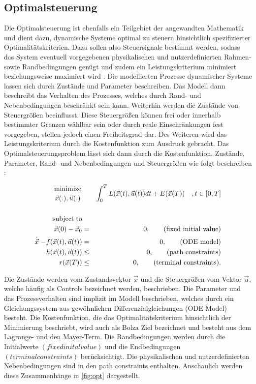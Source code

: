 \subsection{Optimalsteuerung}

Die Optimalsteuerung ist ebenfalls ein Teilgebiet der angewandten Mathematik und dient dazu, dynamische Systeme optimal zu steuern hinsichtlich spezifizierter Optimalitätskriterien. Dazu sollen also Steuersignale bestimmt werden, sodass das System eventuell vorgegebenen physikalischen und nutzerdefinierten Rahmen- sowie Randbedingungen genügt und zudem ein Leistungskriterium minimiert beziehungsweise maximiert wird \cite[S.~3f.]{ki04}.
Die modellierten Prozesse dynamischer Systeme lassen sich durch Zustände und Parameter beschreiben. Das Modell dann beschreibt das Verhalten des Prozesses, welches durch Rand- und Nebenbedingungen beschränkt sein kann. Weiterhin werden die Zustände von Steuergrößen beeinflusst. Diese Steuergrößen können frei oder innerhalb bestimmter Grenzen wählbar sein oder durch reale Einschränkungen fest vorgegeben, stellen jedoch einen Freiheitsgrad dar. Des Weiteren wird das Leistungskriterium durch die Kostenfunktion zum Ausdruck gebracht. Das Optimalsteuerungsproblem lässt sich dann durch die Kostenfunktion, Zustände, Parameter, Rand- und Nebenbedingungen und Steuergrößen wie folgt beschreiben \cite[S.~61]{di14}:

\begin{eqnarray}
\label{eq:opt}
		{\text{minimize} \atop \vec{x}(.),\vec{u}(.)} & &\int_0^T L(\vec{x}(t),\vec{u}(t)) dt + E(\vec{x}(T)) \quad ,t \in [0,T] \\
\nonumber		&&\\
\nonumber		\text{subject}\; \text{to} & &\\
\nonumber		\vec{x}(0)-\vec{x}_{0} & = & 0,	\qquad \text{(fixed initial value)}\\
\nonumber		\stackrel{.}{\vec{x}}-f(\vec{x}(t),\vec{u}(t)) & = & 0,\qquad \text{(ODE model)}\\
\nonumber		h(\vec{x}(t),\vec{u}(t)) & \leq & 0, \qquad \text{(path constraints)}\\
\nonumber		r(\vec{x}(T)) & \leq & 0,\qquad \text{(terminal constraints).}
\end{eqnarray}

Die Zustände werden vom Zustandsvektor $\vec{x}$ und die Steuergrößen vom Vektor $\vec{u}$, welche häufig als Controls bezeichnet werden, beschrieben. Die Parameter und das Prozessverhalten sind implizit im Modell beschrieben, welches durch ein Gleichungssystem aus gewöhnlichen Differenzialgleichungen (ODE Model) besteht. Die Kostenfunktion, die das Optimalitätskriterium hinsichtlich der Minimierung beschriebt, wird auch als Bolza Ziel bezeichnet und besteht aus dem Lagrange- und den Mayer-Term. Die Randbedingungen werden durch die Initialwerte $(fixed inital value)$ und die Endbedingungen $(terminal constraints)$ berücksichtigt. Die physikalischen und nutzerdefinierten Nebenbedingungen sind in den path constraints enthalten. Anschaulich werden diese Zusammenhänge in \ref{fig:opt} dargestellt.

